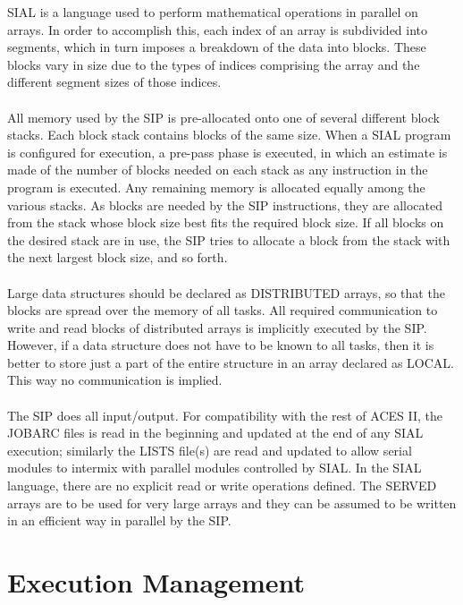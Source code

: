 \documentclass[12pt]{article}
\begin{document}
SIAL is a language used to perform mathematical operations in parallel on arrays. 
In order to accomplish this, each index of an array is subdivided into segments, which 
in turn imposes a breakdown of the data into blocks. These blocks vary in size due to 
the types of indices comprising the array and the different segment sizes of those indices.\\
\\ 
All memory used by the SIP is pre-allocated onto one of several different block stacks. 
Each block stack contains blocks of the same size. When a SIAL program is configured 
for execution, a pre-pass phase is executed, in which an estimate is made of the number 
of blocks needed on each stack as any instruction in the program is executed. Any 
remaining memory is allocated equally among the various stacks. As blocks are needed 
by the SIP instructions, they are allocated from the stack whose block size best fits 
the required block size. If all blocks on the desired stack are in use, the SIP tries 
to allocate a block from the stack with the next largest block size, and so forth.\\
\\ 
Large data structures should be declared as DISTRIBUTED arrays, so that the blocks are 
spread over the memory of all tasks. All required communication to write and read blocks 
of distributed arrays is implicitly executed by the SIP. However, if a data structure 
does not have to be known to all tasks, then it is better to store just a part of the 
entire structure in an array declared as LOCAL. This way no communication is implied.\\
\\ 
The SIP does all input/output. For compatibility with the rest of ACES II, the JOBARC 
files is read in the beginning and updated at the end of any SIAL execution; similarly 
the LISTS file(s) are read and updated to allow serial modules to intermix with parallel 
modules controlled by SIAL. In the SIAL language, there are no explicit read or write 
operations defined. The SERVED arrays are to be used for very large arrays and they can 
be assumed to be written in an efficient way in parallel by the SIP.\\

\section{Execution Management}
\end{document}
